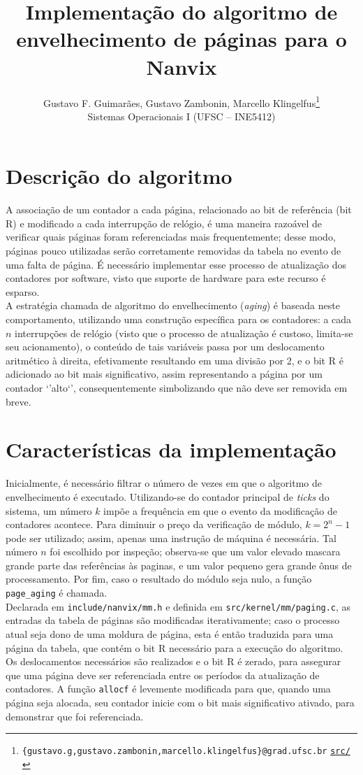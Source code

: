 \documentclass[12pt]{article}
\title{\textbf{Implementação do algoritmo de envelhecimento
  de páginas para o Nanvix}}
\author{
  Gustavo F. Guimarães, Gustavo Zambonin, Marcello Klingelfus\thanks{
    \texttt{\{gustavo.g,gustavo.zambonin,marcello.klingelfus\}@grad.ufsc.br}
    \hfill \texttt{\href{https://github.com/zambonin/nanvix}{src/}}
  } \\
  \small{Sistemas Operacionais I (UFSC -- INE5412)}
}
\date{}
\begin{document}
\maketitle

\section{Descrição do algoritmo}

A associação de um contador a cada página, relacionado ao bit de referência
(bit R) e modificado a cada interrupção de relógio, é uma maneira razoável de
verificar quais páginas foram referenciadas mais frequentemente; desse modo,
páginas pouco utilizadas serão corretamente removidas da tabela no evento de
uma falta de página. É necessário implementar esse processo de atualização dos
contadores por software, visto que suporte de hardware para este recurso é
esparso. \\

A estratégia chamada de algoritmo do envelhecimento (\emph{aging}) é baseada
neste comportamento, utilizando uma construção específica para os contadores: a
cada $n$ interrupções de relógio (visto que o processo de atualização é
custoso, limita-se seu acionamento), o conteúdo de tais variáveis passa por um
deslocamento aritmético à direita, efetivamente resultando em uma divisão por
2, e o bit R é adicionado ao bit mais significativo, assim representando a
página por um contador `'alto`', consequentemente simbolizando que não deve ser
removida em breve.

\section{Características da implementação}

Inicialmente, é necessário filtrar o número de vezes em que o algoritmo de
envelhecimento é executado. Utilizando-se do contador principal de \emph{ticks}
do sistema, um número $k$ impõe a frequência em que o evento da modificação de
contadores acontece. Para diminuir o preço da verificação de módulo,
$k = 2^n - 1$ pode ser utilizado; assim, apenas uma instrução de máquina é
necessária. Tal número $n$ foi escolhido por inspeção; observa-se que um valor
elevado mascara grande parte das referências às paginas, e um valor pequeno
gera grande ônus de processamento. Por fim, caso o resultado do módulo seja
nulo, a função \texttt{page\_aging} é chamada. \\

Declarada em \texttt{include/nanvix/mm.h} e definida em
\texttt{src/kernel/mm/paging.c}, as entradas da tabela de páginas são
modificadas iterativamente; caso o processo atual seja dono de uma moldura de
página, esta é então traduzida para uma página da tabela, que contém o bit R
necessário para a execução do algoritmo. Os deslocamentos necessários são
realizados e o bit R é zerado, para assegurar que uma página deve ser
referenciada entre os períodos da atualização de contadores. A função
\texttt{allocf} é levemente modificada para que, quando uma página seja
alocada, seu contador inicie com o bit mais significativo ativado, para
demonstrar que foi referenciada.
\end{document}
